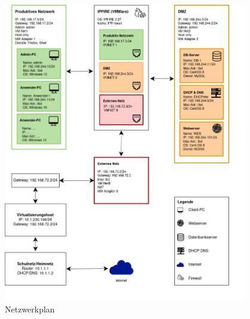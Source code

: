 \documentclass[a4paper,
    11pt,
    headings=small,
    ngerman,
    listof=totoc,
    numbers=noenddot]{scrreprt}[2021/11/13]
\begin{document}
\begin{figure}[h!]
  \centering
  \includegraphics[width=0.95\textwidth]{data/Netzwerkplan.png}
  \caption{Netzwerkplan}
  \label{fig:Netzwerkplan}
\end{figure}
\end{document}
